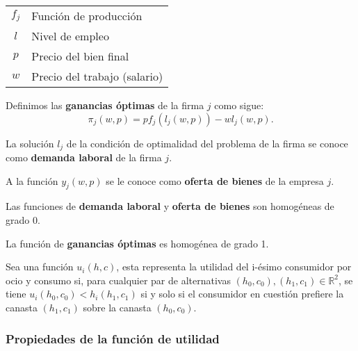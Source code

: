 \documentclass[8pt,a4paper]{extarticle}
\begin{document}
\begin{multicols}{3}
\begin{center}
\begin{tabular}{ c l }
	\hline
	$f_j$ & Función de producción \\
	$l$   & Nivel de empleo \\
	$p$   & Precio del bien final \\
	$w$   & Precio del trabajo (salario) \\
	\hline
\end{tabular}
\end{center}

\begin{boxdef}
	Definimos las \textbf{ganancias óptimas} de la firma $j$ como sigue:
	\[
		\pi_j(w, p) = pf_j(l_j(w, p)) - wl_j(w, p)
	.\] 
\end{boxdef}

\begin{boxdef}
	La solución $l_j$ de la condición de optimalidad del problema de la firma se conoce como \textbf{demanda laboral} de la firma $j$.
\end{boxdef}

\begin{boxdef}
	A la función $y_j(w, p)$ se le conoce como \textbf{oferta de bienes} de la empresa $j$.
\end{boxdef}

\begin{boxprop}
	Las funciones de \textbf{demanda laboral} y \textbf{oferta de bienes}  son homogéneas de grado 0.
\end{boxprop}

\begin{boxprop}
	La función de \textbf{ganancias óptimas} es homogénea de grado 1.
\end{boxprop}

\begin{boxdef}
	Sea una función $u_i(h, c)$, esta representa la utilidad del i-ésimo  consumidor por ocio y consumo si, para cualquier par de alternativas $(h_0, c_0), (h_1, c_1) \in \mathbb{R}^2$, se tiene $u_i(h_0, c_0) < h_i(h_1, c_1)$ si y solo si  el consumidor en cuestión prefiere la canasta $(h_1, c_1)$ sobre la canasta $(h_0, c_0)$.
\end{boxdef}

\subsubsection*{Propiedades de la función de utilidad}


\end{multicols}
\end{document}
